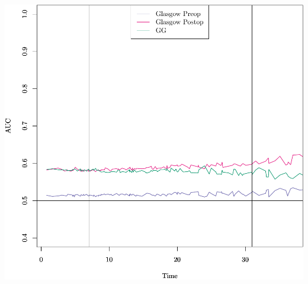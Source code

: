 \documentclass{article}\usepackage[]{graphicx}\usepackage[]{color}
\makeatletter
\def\maxwidth{ %
  \ifdim\Gin@nat@width>\linewidth
    \linewidth
  \else
    \Gin@nat@width
  \fi
}
\newenvironment{knitrout}{}{} %
\makeatother
\begin{document}
\begin{knitrout}
{\centering \includegraphics[width=\maxwidth]{figure/07-risksetROC-glasgow-1} 

}



\end{knitrout}
\end{document}
